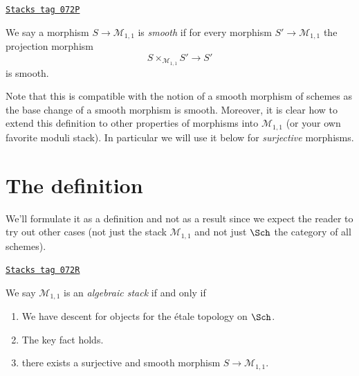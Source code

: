 \begin{definition}[Smooth]
\label{stacks-introduction-definition-smooth}
\href{https://stacks.math.columbia.edu/tag/072P}{\texttt{Stacks tag 072P}}

We say a morphism $S \to \mathcal{M}_{1, 1}$ is {\it smooth} if for every
morphism $S' \to \mathcal{M}_{1, 1}$ the projection morphism
$$
S \times_{\mathcal{M}_{1, 1}} S' \longrightarrow S'
$$
is smooth.
\end{definition}

Note that this is compatible with the notion of a smooth morphism
of schemes as the base change of a smooth morphism is smooth.
Moreover, it is clear how to extend this definition to other properties
of morphisms into $\mathcal{M}_{1, 1}$ (or your own favorite moduli stack).
In particular we will use it below for {\it surjective} morphisms.

\section{The definition}
\label{stacks-introduction-section-definition}
We'll formulate it as a definition and not as a result
since we expect the reader to try out other cases (not just
the stack $\mathcal{M}_{1, 1}$ and not just $\Sch$ the category of all
schemes).

\begin{definition}
\label{stacks-introduction-definition-algebraic-stack}
\href{https://stacks.math.columbia.edu/tag/072R}{\texttt{Stacks tag 072R}}

We say $\mathcal{M}_{1, 1}$ is an {\it algebraic stack} if and only if
\begin{enumerate}
\item We have descent for objects for the \'etale topology on $\Sch$.
\item The key fact holds.
\item there exists a surjective and smooth morphism
$S \to \mathcal{M}_{1, 1}$.
\end{enumerate}
\end{definition}

